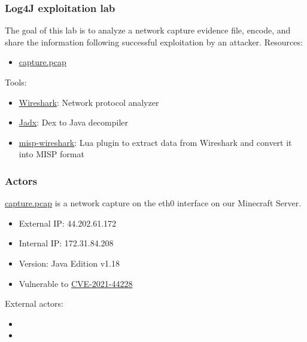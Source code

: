 
\begin{frame}[t,plain]
\titlepage
\end{frame}

\begin{frame}
    \frametitle{Log4J exploitation lab}
    The goal of this lab is to analyze a network capture evidence file, encode, and share the information following successful exploitation by an attacker.
	\linebreak
	\linebreak
	\linebreak
    Resources:
    \begin{itemize}
        \item \href{https://github.com/MISP/misp-training-lea/tree/main/e.304-lab3-encoding-information-and-sharing-it-2/dataset/capture.pcap}{\underline{capture.pcap}}
    \end{itemize}
    Tools:
    \begin{itemize}
        \item \href{https://www.wireshark.org/}{\underline{Wireshark}}: Network protocol analyzer
        \item \href{https://github.com/skylot/jadx}{\underline{Jadx}}: Dex to Java decompiler
        \item \href{https://github.com/MISP/misp-wireshark}{\underline{misp-wireshark}}: Lua plugin to extract data from Wireshark and convert it into MISP format 
    \end{itemize}

\end{frame}

\begin{frame}
    \frametitle{Actors}
    \href{https://github.com/MISP/misp-training-lea/tree/main/e.304-lab3-encoding-information-and-sharing-it-2/dataset/capture.pcap}{\underline{capture.pcap}} is a network capture on the eth0 interface on our Minecraft Server.
    \linebreak
    \linebreak
    {\color{blue}{\bf Minecraft Server}}
    \begin{itemize}
    	\item External IP: 44.202.61.172
	    \item Internal IP: 172.31.84.208
	    \item Version: Java Edition v1.18 
	    \item Vulnerable to \href{https://nvd.nist.gov/vuln/detail/CVE-2021-44228}{CVE-2021-44228}
    \end{itemize}
    
    External actors:
    \begin{itemize}
        \item {\color{green}{\bf Player}}
        \item {\color{red}{\bf Attacker}}
    \end{itemize}

    \note[item]{}
\end{frame}

